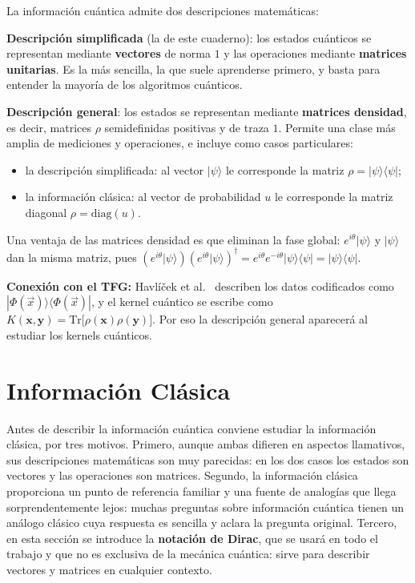 \documentclass[11pt, a4paper, twoside, openright]{report}
\begin{document}
\begin{tcolorbox}[colback=teal!5!white,colframe=teal!75!black,title=\textbf{Nota Teórica: Dos descripciones de la información cuántica}]
La información cuántica admite dos descripciones matemáticas:

\textbf{Descripción simplificada} (la de este cuaderno): los estados cuánticos se representan mediante \textbf{vectores} de norma $1$ y las operaciones mediante \textbf{matrices unitarias}. Es la más sencilla, la que suele aprenderse primero, y basta para entender la mayoría de los algoritmos cuánticos.

\textbf{Descripción general}: los estados se representan mediante \textbf{matrices densidad}, es decir, matrices $\rho$ semidefinidas positivas y de traza $1$. Permite una clase más amplia de mediciones y operaciones, e incluye como casos particulares:
\begin{itemize}
    \item la descripción simplificada: al vector $|\psi\rangle$ le corresponde la matriz $\rho = |\psi\rangle\langle\psi|$;
    \item la información clásica: al vector de probabilidad $u$ le corresponde la matriz diagonal $\rho = \mathrm{diag}(u)$.
\end{itemize}
Una ventaja de las matrices densidad es que eliminan la fase global: $e^{i\theta}|\psi\rangle$ y $|\psi\rangle$ dan la misma matriz, pues $\left(e^{i\theta}|\psi\rangle\right)\left(e^{i\theta}|\psi\rangle\right)^\dagger = e^{i\theta}e^{-i\theta}|\psi\rangle\langle\psi| = |\psi\rangle\langle\psi|$.

\textbf{Conexión con el TFG:} Havlíček et al.\ \cite{havlicek2019supervised} describen los datos codificados como $|\Phi(\vec x)\rangle\langle\Phi(\vec x)|$, y el kernel cuántico se escribe como $K(\mathbf{x},\mathbf{y}) = \mathrm{Tr}\big[\rho(\mathbf{x})\rho(\mathbf{y})\big]$. Por eso la descripción general aparecerá al estudiar los kernels cuánticos.
\end{tcolorbox}
\cleardoublepage
\section{Información Clásica}

\noindent Antes de describir la información cuántica conviene estudiar la información clásica, por tres motivos. Primero, aunque ambas difieren en aspectos llamativos, sus descripciones matemáticas son muy parecidas: en los dos casos los estados son vectores y las operaciones son matrices. Segundo, la información clásica proporciona un punto de referencia familiar y una fuente de analogías que llega sorprendentemente lejos: muchas preguntas sobre información cuántica tienen un análogo clásico cuya respuesta es sencilla y aclara la pregunta original. Tercero, en esta sección se introduce la \textbf{notación de Dirac}, que se usará en todo el trabajo y que no es exclusiva de la mecánica cuántica: sirve para describir vectores y matrices en cualquier contexto.
\end{document}
